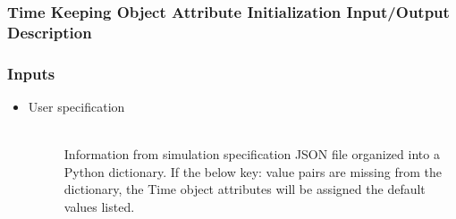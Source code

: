\documentclass[cleanfoot]{asme2ej}
\begin{document}
\subsubsection{Time Keeping Object Attribute Initialization Input/Output Description}

\subsubsection*{Inputs}
\begin{itemize}
    \item
    \begin{description}
        \item[User specification] \hfill \\
        Information from simulation specification JSON file organized into a Python dictionary. If the below key: value pairs are missing from the dictionary, the Time object attributes will be assigned the default values listed.
    \end{description}
\end{itemize}
\end{document}
